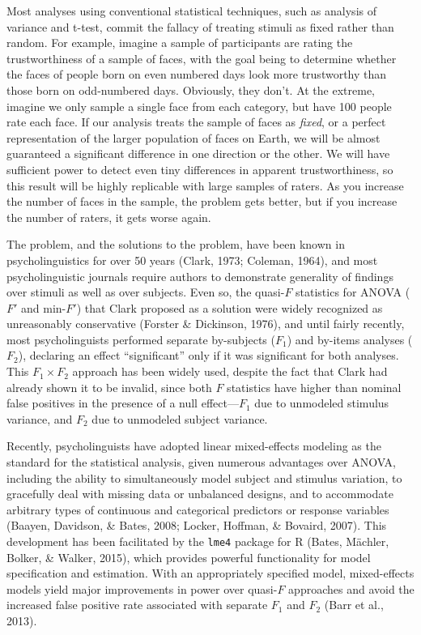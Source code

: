 \documentclass[english,doc,floatsintext]{apa6}
\begin{document}
Most analyses using conventional statistical techniques, such as analysis of variance and t-test, commit the fallacy of treating stimuli as fixed rather than random. For example, imagine a sample of participants are rating the trustworthiness of a sample of faces, with the goal being to determine whether the faces of people born on even numbered days look more trustworthy than those born on odd-numbered days. Obviously, they don't. At the extreme, imagine we only sample a single face from each category, but have 100 people rate each face. If our analysis treats the sample of faces as \emph{fixed}, or a perfect representation of the larger population of faces on Earth, we will be almost guaranteed a significant difference in one direction or the other. We will have sufficient power to detect even tiny differences in apparent trustworthiness, so this result will be highly replicable with large samples of raters. As you increase the number of faces in the sample, the problem gets better, but if you increase the number of raters, it gets worse again.

The problem, and the solutions to the problem, have been known in psycholinguistics for over 50 years (Clark, 1973; Coleman, 1964), and most psycholinguistic journals require authors to demonstrate generality of findings over stimuli as well as over subjects. Even so, the quasi-\(F\) statistics for ANOVA (\(F'\) and min-\(F'\)) that Clark proposed as a solution were widely recognized as unreasonably conservative (Forster \& Dickinson, 1976), and until fairly recently, most psycholinguists performed separate by-subjects (\(F_1\)) and by-items analyses (\(F_2\)), declaring an effect \enquote{significant} only if it was significant for both analyses. This \(F_1 \times F_2\) approach has been widely used, despite the fact that Clark had already shown it to be invalid, since both \(F\) statistics have higher than nominal false positives in the presence of a null effect---\(F_1\) due to unmodeled stimulus variance, and \(F_2\) due to unmodeled subject variance.

Recently, psycholinguists have adopted linear mixed-effects modeling as the standard for the statistical analysis, given numerous advantages over ANOVA, including the ability to simultaneously model subject and stimulus variation, to gracefully deal with missing data or unbalanced designs, and to accommodate arbitrary types of continuous and categorical predictors or response variables (Baayen, Davidson, \& Bates, 2008; Locker, Hoffman, \& Bovaird, 2007). This development has been facilitated by the \texttt{lme4} package for R (Bates, Mächler, Bolker, \& Walker, 2015), which provides powerful functionality for model specification and estimation. With an appropriately specified model, mixed-effects models yield major improvements in power over quasi-\(F\) approaches and avoid the increased false positive rate associated with separate \(F_1\) and \(F_2\) (Barr et al., 2013).
\end{document}
